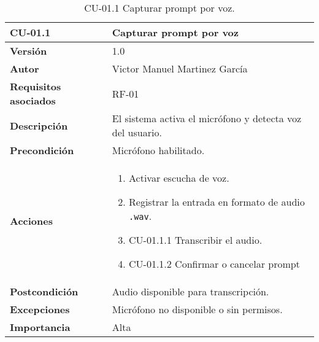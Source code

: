 \begin{table}[p]
    \centering
    \begin{tabularx}{\linewidth}{ p{} p{} }
        \toprule
        \textbf{CU-01.1}    & \textbf{Capturar prompt por voz}\\
        \toprule
        \textbf{Versión}              & 1.0 \\
        \textbf{Autor}                & Victor Manuel Martinez García \\
        \textbf{Requisitos asociados} & RF-01 \\
        \textbf{Descripción}          & El sistema activa el micrófono y detecta voz del usuario.\\
        \textbf{Precondición}         & Micrófono habilitado.\\
        \textbf{Acciones}             &
        \begin{enumerate}
          \item Activar escucha de voz.
          \item Registrar la entrada en formato de audio \texttt{.wav}.
          \item CU-01.1.1 Transcribir el audio.
          \item CU-01.1.2 Confirmar o cancelar prompt
        \end{enumerate}\\
        \textbf{Postcondición}        & Audio disponible para transcripción.\\
        \textbf{Excepciones}          & Micrófono no disponible o sin permisos.\\
        \textbf{Importancia}          & Alta \\
        \bottomrule
    \end{tabularx}
    \caption{CU-01.1 Capturar prompt por voz.}
        \label{CU-01.1 Capturar prompt por voz}
\end{table}


